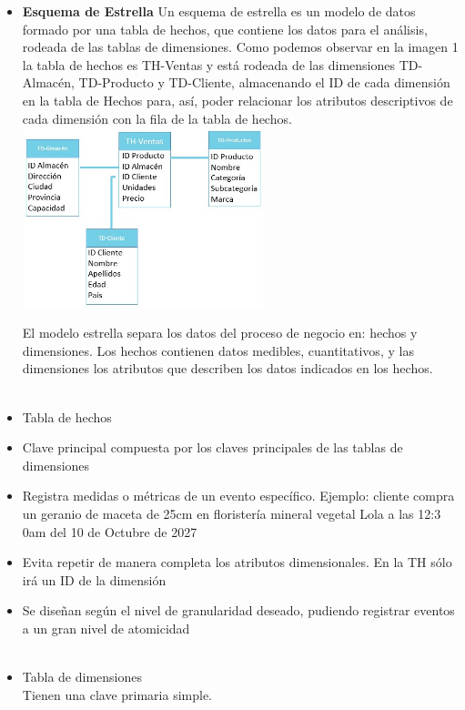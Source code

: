 \documentclass[twoside,twocolumn]{article}
\begin{document}
\begin{enumerate}
\begin{itemize}
\item\textbf{Esquema de Estrella}
Un esquema de estrella es un modelo de datos formado por una tabla de hechos, que contiene los datos para el análisis, rodeada de las tablas de dimensiones.
Como podemos observar en la imagen 1 la tabla de hechos es TH-Ventas y está rodeada de las dimensiones TD-Almacén, TD-Producto y TD-Cliente, almacenando el ID de cada dimensión en la tabla de Hechos para, así, poder relacionar los atributos descriptivos de cada dimensión con la fila de la tabla de hechos.
\includegraphics[width=7cm]{Imagenes/1.jpg}

El modelo estrella separa los datos del proceso de negocio en: hechos y dimensiones. Los hechos contienen datos medibles, cuantitativos, y las dimensiones los atributos que describen los datos indicados en los hechos.
\\\\

\item Tabla de hechos
\\
\item Clave principal compuesta por los claves principales de las tablas de dimensiones

\item Registra medidas o métricas de un evento específico. Ejemplo: cliente compra un geranio de maceta de 25cm en floristería mineral vegetal Lola a las 12:3 0am del 10 de Octubre de 2027

\item Evita repetir de manera completa los atributos dimensionales. En la TH sólo irá un ID de la dimensión

\item Se diseñan según el nivel de granularidad deseado, pudiendo registrar eventos a un gran nivel de atomicidad
\\\\
\item Tabla de dimensiones\\
Tienen una clave primaria simple.
\\


\end{itemize}
\end{enumerate}
\end{document}
